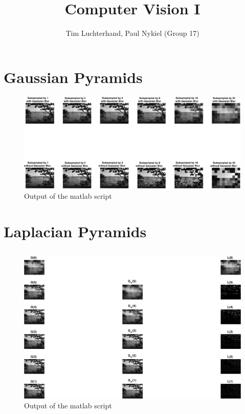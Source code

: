 \documentclass[DIN, pagenumber=false, fontsize=11pt, parskip=half]{scrartcl}
\title{Computer Vision I}
\author{Tim Luchterhand, Paul Nykiel (Group 17)}
\begin{document}
    \maketitle
    \section{Gaussian Pyramids}
    
    \begin{figure}[H]
        \centering
        \includegraphics[width=\textwidth]{sh05ex01.eps}
        \caption{Output of the matlab script}
    \end{figure}

    \section{Laplacian Pyramids}
    \subsection{}
    
    \begin{figure}[H]
        \centering
        \includegraphics[width=\textwidth]{sh05ex02_1.eps}
        \caption{Output of the matlab script}
    \end{figure}
\end{document}
